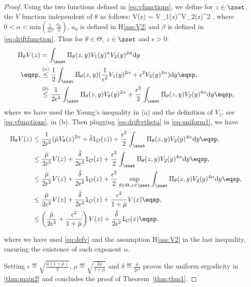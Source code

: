 \documentclass[10pt,twocolumn,letterpaper]{article}
\begin{document}
\begin{proof}
Using the two functions defined in \eqref{eq:vfunctions}, we define for $z \in \zset$, the $V$ function independent of $\theta$ as follows:
\beq\label{eq:defv}
V(z) = V_1(z)^\alpha V_2(z)^{2\alpha} \eqsp,
\eeq
where $0 < \alpha < \textrm{min}(\frac{1}{2\beta},\frac{a_0}{3})$, $a_0$ is defined in H\ref{ass:V2} and $\beta$ is defined in \eqref{eq:driftfunction}.
Thus for $\theta \in \Theta$, $z \in \zset$ and $\epsilon >0$:
\begin{align}\notag
\Pi_\theta V(z) & = \int_{\zset} \Pi_\theta(z,y) V_1(y)^\alpha V_2(y)^{2\alpha} \textrm{d}y\\ \notag \eqsp,
& \overset{(a)}{\leq} \frac{1}{2} \int_{\zset} \Pi_\theta(z,y) (\frac{1}{\epsilon^2}V_1(y)^{2\alpha} + \epsilon^2 V_2(y)^{4\alpha}) \textrm{d}y \eqsp,\\ 
& \overset{(b)}{\leq} \frac{1}{2\epsilon^2} \int_{\zset} \Pi_\theta(z,y) V_\theta(y)^{2\alpha} + \frac{\epsilon^2}{2}  \int_{\zset} \Pi_\theta(z,y)  V_2(y)^{4\alpha} \textrm{d}y \label{eq:uniform1} \eqsp,
\end{align}
where we have used the Young's inequality in (a) and the definition of $V_1$, see \eqref{eq:vfunctions}, in (b).
Then plugging \eqref{eq:driftvtheta} in \eqref{eq:uniform1}, we have
\begin{align}
\Pi_\theta V(z) & \leq \frac{1}{2\epsilon^2} (\bar{\mu} V_\theta(z)^{2\alpha} + \bar{\delta} \mathsf{1}_{\mathcal{O}}(z) ) + \frac{\epsilon^2}{2}  \int_{\zset} \Pi_\theta(z,y)  V_2(y)^{4\alpha} \textrm{d}y \eqsp,\\
& \leq \frac{\bar{\mu}}{2 \epsilon^2} V(z) +\frac{\bar{\delta}}{2 \epsilon^2} \mathsf{1}_{\mathcal{O}}(z)  + \frac{\epsilon^2}{2}  \int_{\zset} \Pi_\theta(z,y)  V_2(y)^{4\alpha} \textrm{d}y \eqsp,\\
& \leq \frac{\bar{\mu}}{2 \epsilon^2} V(z) +\frac{\bar{\delta}}{2 \epsilon^2} \mathsf{1}_{\mathcal{O}}(z)  + \frac{\epsilon^2}{2} \sup \limits_{\theta \in \Theta, z \in \zset} \int_{\zset} \Pi_\theta(z,y)  V_2(y)^{4\alpha} \textrm{d}y \eqsp,\\
& \leq \frac{\bar{\mu}}{2 \epsilon^2} V(z) +\frac{\bar{\delta}}{2 \epsilon^2} \mathsf{1}_{\mathcal{O}}(z)  + \frac{\epsilon^2}{1 + \bar{\mu}}V(z) \eqsp,\\
& \leq \left(\frac{\bar{\mu}}{2 \epsilon^2} + \frac{\epsilon^2}{1 + \bar{\mu}} \right) V(z) +\frac{\bar{\delta}}{2 \epsilon^2} \mathsf{1}_{\mathcal{O}}(z) \eqsp,
\end{align}

where we have used \eqref{eq:defv} and the assumption H\ref{ass:V2} in the last inequality, ensuring the existence of such exponent $\alpha$.

Setting $\epsilon \eqdef \sqrt{\frac{\bar{\mu}(1+\bar{\mu})}{2}}$, $ \mu  \eqdef  \sqrt{\frac{2\bar{\mu}}{1+\bar{\mu}}}$ and $\delta \eqdef \frac{\bar{\delta}}{2 \epsilon^2}$ proves the uniform ergodicity in \eqref{thm:main2} and concludes the proof of Theorem~\ref{thm:thm1}.
\end{proof}
\end{document}
